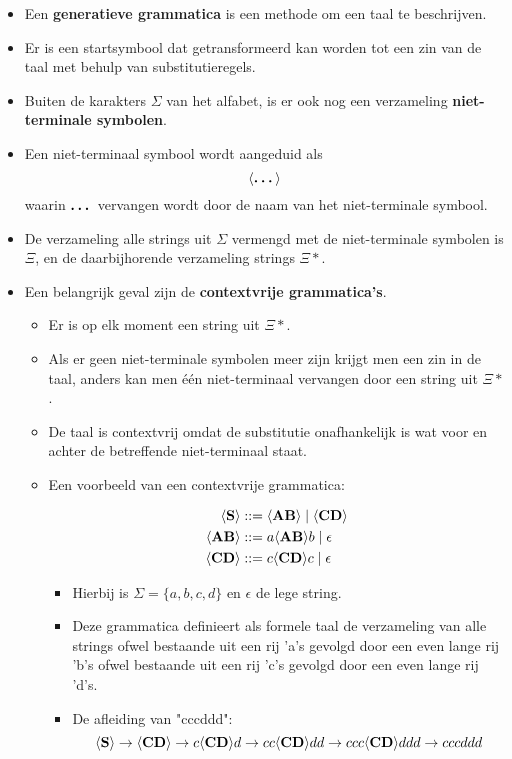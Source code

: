 \begin{itemize}
    \item Een \textbf{generatieve grammatica} is een methode om een taal te beschrijven.
    \item Er is een startsymbool dat getransformeerd kan worden tot een zin van de taal met behulp van substitutieregels.
    \item Buiten de karakters $\Sigma$ van het alfabet, is er ook nog een verzameling \textbf{niet-terminale symbolen}.
    \item Een niet-terminaal symbool wordt aangeduid als
        $$\langle \textbf{\dots} \rangle$$
        waarin $\textbf{\dots}$ vervangen wordt door de naam van het niet-terminale symbool. 
    \item De verzameling alle strings uit $\Sigma$ vermengd met de niet-terminale symbolen is $\Xi$, en de daarbijhorende verzameling strings $\Xi*$.
    \item Een belangrijk geval zijn de \textbf{contextvrije grammatica's}.
    \begin{itemize}
        \item Er is op elk moment een string uit $\Xi*$.
        \item Als er geen niet-terminale symbolen meer zijn krijgt men een zin in de taal, anders kan men één niet-terminaal vervangen door een string uit $\Xi*$.
        \item De taal is contextvrij omdat de substitutie onafhankelijk is wat voor en achter de betreffende niet-terminaal staat.
        \item Een voorbeeld van een contextvrije grammatica:

        \begin{align*}
             \langle \textbf{S} \rangle &::= \langle \textbf{AB} \rangle\;|\;\langle \textbf{CD} \rangle \\
             \langle \textbf{AB} \rangle &::= a\langle \textbf{AB} \rangle b\;|\;\epsilon \\
             \langle \textbf{CD} \rangle &::= c\langle \textbf{CD} \rangle c\;|\;\epsilon
        \end{align*}
        \begin{itemize}
            \item Hierbij is $\Sigma = \{ a, b, c, d \}$ en $\epsilon$ de lege string.
            \item Deze grammatica definieert als formele taal de verzameling van alle strings ofwel bestaande uit een rij 'a's gevolgd door een even lange rij 'b's ofwel bestaande uit een rij 'c's gevolgd door een even lange rij 'd's.    
            \item De afleiding van "cccddd":
            $$\langle \textbf{S} \rangle \rightarrow \langle \textbf{CD} \rangle \rightarrow c\langle \textbf{CD} \rangle d \rightarrow cc\langle \textbf{CD} \rangle dd \rightarrow ccc\langle \textbf{CD} \rangle ddd \rightarrow cccddd$$
        \end{itemize}
    \end{itemize}
\end{itemize}

